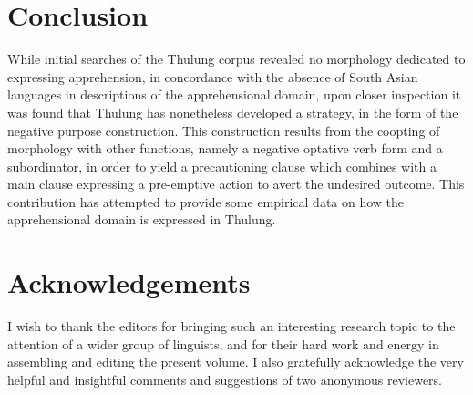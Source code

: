 \documentclass[output=paper,colorlinks,citecolor=brown,
]{langscibook}
\begin{document}
\section{Conclusion}
\label{lahaussois-conclusion}

While initial searches of the Thulung corpus revealed no morphology dedicated to expressing apprehension, in concordance with the absence of South Asian languages in descriptions of the apprehensional domain, upon closer inspection it was found that Thulung has nonetheless developed a strategy, in the form of the negative purpose construction. This construction results from the coopting of morphology with other functions, namely a negative optative verb form and a subordinator, in order to yield a precautioning clause which combines with a main clause expressing a pre-emptive action to avert the undesired outcome. This contribution has attempted to provide some empirical data on how the apprehensional domain is expressed in Thulung.

\section*{Acknowledgements}

I wish to thank the editors for bringing such an interesting research topic to the attention of a wider group of linguists, and for their hard work and energy in assembling and editing the present volume. I also gratefully acknowledge the very helpful and insightful comments and suggestions of two anonymous reviewers.
\end{document}
